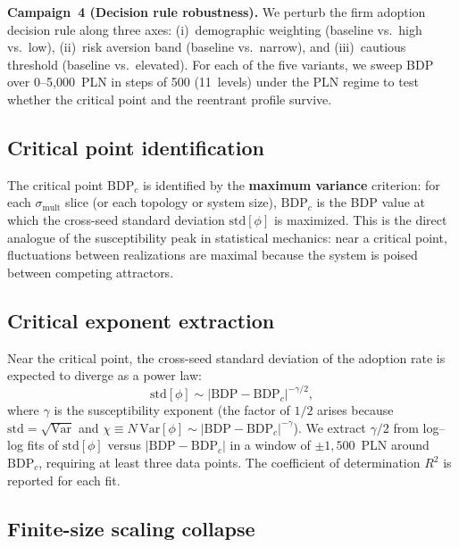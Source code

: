 \documentclass[12pt,a4paper]{article}
\begin{document}
\textbf{Campaign~4 (Decision rule robustness).} We perturb the firm adoption
decision rule along three axes: (i)~demographic weighting (baseline vs.\ high
vs.\ low), (ii)~risk aversion band (baseline vs.\ narrow), and
(iii)~cautious threshold (baseline vs.\ elevated). For each of the five
variants, we sweep BDP over 0--5{,}000~PLN in steps of 500 (11~levels) under
the PLN regime to test whether the critical point and the reentrant profile
survive.

\subsection{Critical point identification}

The critical point $\mathrm{BDP}_c$ is identified by the \textbf{maximum
variance} criterion: for each $\sigma_{\mathrm{mult}}$ slice (or each topology
or system size), $\mathrm{BDP}_c$ is the BDP value at which the cross-seed
standard deviation $\mathrm{std}[\phi]$ is maximized. This is the direct
analogue of the susceptibility peak in statistical mechanics: near a critical
point, fluctuations between realizations are maximal because the system is
poised between competing attractors.

\subsection{Critical exponent extraction}

Near the critical point, the cross-seed standard deviation of the adoption
rate is expected to diverge as a power law:
\begin{equation}
    \mathrm{std}[\phi] \sim |\mathrm{BDP} - \mathrm{BDP}_c|^{-\gamma/2},
    \label{eq:gamma_half}
\end{equation}
where $\gamma$ is the susceptibility exponent (the factor of $1/2$ arises
because $\mathrm{std} = \sqrt{\mathrm{Var}}$ and $\chi \equiv N \,
\mathrm{Var}[\phi] \sim |\mathrm{BDP} - \mathrm{BDP}_c|^{-\gamma}$). We
extract $\gamma/2$ from log--log fits of $\mathrm{std}[\phi]$ versus
$|\mathrm{BDP} - \mathrm{BDP}_c|$ in a window of $\pm 1{,}500$~PLN around
$\mathrm{BDP}_c$, requiring at least three data points. The coefficient of
determination $R^2$ is reported for each fit.

\subsection{Finite-size scaling collapse}
\end{document}
